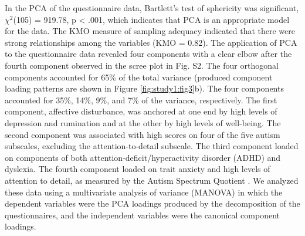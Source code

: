 In the PCA of the questionnaire data, Bartlett’s test of sphericity was significant,
$\chi^{2}$(105) = 919.78, 
p < .001, which indicates that PCA is an appropriate model for the data. The KMO measure of sampling adequacy indicated that there were strong relationships among the variables (KMO = 0.82). The application of PCA to the questionnaire data revealed four components with a clear elbow after the fourth component observed in the scree plot in Fig. S2. The four orthogonal components accounted for 65\% of the total variance (produced component loading patterns are shown in Figure \ref{fig:study1:fig3}b). The four components accounted for 35\%, 14\%, 9\%, and 7\% of the variance, respectively. The first component, affective disturbance, was anchored at one end by high levels of depression and rumination and at the other by high levels of well-being. The second component was associated with high scores on four of the five autism subscales, excluding the attention-to-detail subscale. The third component loaded on components of both attention-deficit/hyperactivity disorder (ADHD) and dyslexia. The fourth component loaded on trait anxiety and high levels of attention to detail, as measured by the Autism Spectrum Quotient \cite{Baron-Cohen2001}. We analyzed these data using a multivariate analysis of variance (MANOVA) in which the dependent variables were the PCA loadings produced by the decomposition of the questionnaires, and the independent variables were the canonical component loadings.
